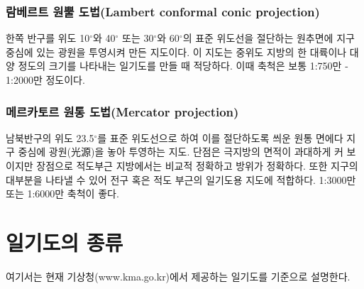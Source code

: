 \subsubsection{람베르트 원뿔 도법(Lambert conformal conic projection)}
한쪽 반구를 위도 10$^{\circ}$와 40$^{\circ}$ 또는 30$^{\circ}$와 60$^{\circ}$의 표준 위도선을 절단하는 원추면에 지구 중심에 있는 광원을 투영시켜 만든 지도이다. 이 지도는 중위도 지방의 한 대륙이나 대양 정도의 크기를 나타내는 일기도를 만들 때 적당하다. 이때 축척은 보통 1:750만 - 1:2000만 정도이다.





\subsubsection{메르카토르 원통 도법(Mercator projection)}
남북반구의 위도 23.5$^{\circ}$를 표준 위도선으로 하여 이를 절단하도록 씌운 원통 면에다 지구 중심에 광원(光源)을 놓아 투영하는 지도. 단점은 극지방의 면적이 과대하게 커 보이지만 장점으로 적도부근 지방에서는 비교적 정확하고 방위가 정확하다. 또한 지구의 대부분을 나타낼 수 있어 전구 혹은 적도 부근의 일기도용 지도에 적합하다. 1:3000만 또는 1:6000만 축척이 좋다.


\section{일기도의 종류}
여기서는 현재 기상청(www.kma.go.kr)에서 제공하는 일기도를 기준으로 설명한다.


